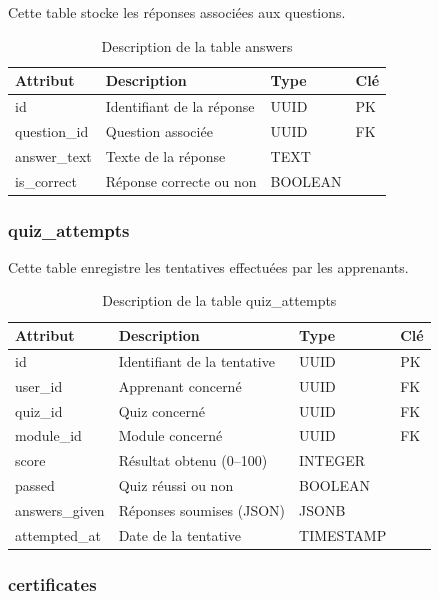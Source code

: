 \documentclass[12pt, a4paper]{report}
\begin{document}
Cette table stocke les réponses associées aux questions.

\begin{table}[H]
\centering
\caption{Description de la table answers}
\begin{tabularx}{\textwidth}{|p{3cm}|X|p{2.5cm}|p{1.5cm}|}
\hline
Attribut & Description & Type & Clé \\
\hline
id & Identifiant de la réponse & UUID & PK \\
question\_id & Question associée & UUID & FK \\
answer\_text & Texte de la réponse & TEXT & \\
is\_correct & Réponse correcte ou non & BOOLEAN & \\
\hline
\end{tabularx}
\end{table}

\subsubsection{quiz\_attempts}

Cette table enregistre les tentatives effectuées par les apprenants.

\begin{table}[H]
\centering
\caption{Description de la table quiz\_attempts}
\begin{tabularx}{\textwidth}{|p{3cm}|X|p{2.5cm}|p{1.5cm}|}
\hline
Attribut & Description & Type & Clé \\
\hline
id & Identifiant de la tentative & UUID & PK \\
user\_id & Apprenant concerné & UUID & FK \\
quiz\_id & Quiz concerné & UUID & FK \\
module\_id & Module concerné & UUID & FK \\
score & Résultat obtenu (0--100) & INTEGER & \\
passed & Quiz réussi ou non & BOOLEAN & \\
answers\_given & Réponses soumises (JSON) & JSONB & \\
attempted\_at & Date de la tentative & TIMESTAMP & \\
\hline
\end{tabularx}
\end{table}

\subsubsection{certificates}
\end{document}
